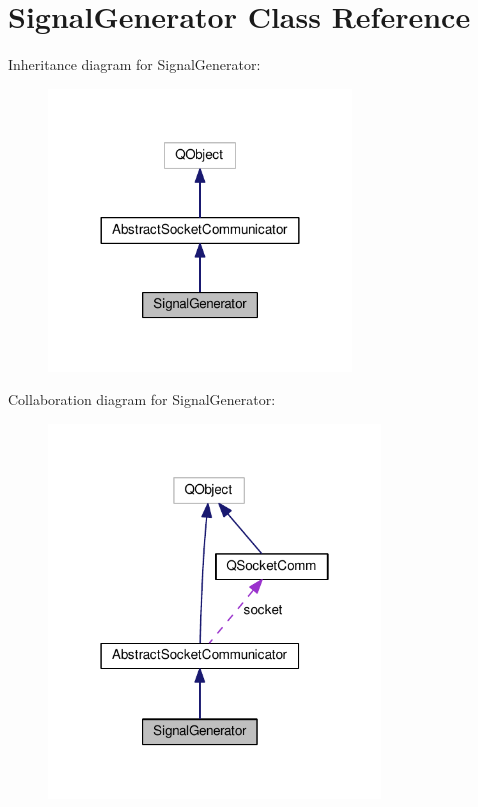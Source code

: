 \hypertarget{class_signal_generator}{}\section{Signal\+Generator Class Reference}
\label{class_signal_generator}


Inheritance diagram for Signal\+Generator\+:\nopagebreak
\begin{figure}[H]
\begin{center}
\leavevmode
\includegraphics[width=228pt]{class_signal_generator__inherit__graph}
\end{center}
\end{figure}


Collaboration diagram for Signal\+Generator\+:\nopagebreak
\begin{figure}[H]
\begin{center}
\leavevmode
\includegraphics[width=250pt]{class_signal_generator__coll__graph}
\end{center}
\end{figure}

